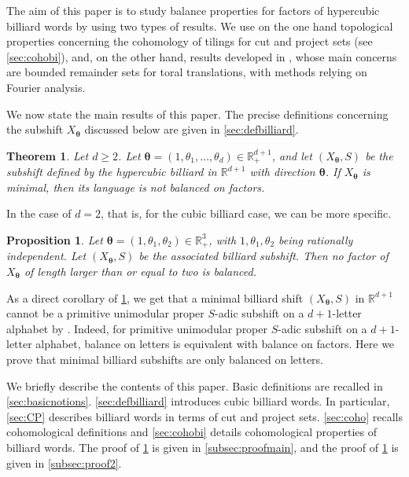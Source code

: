 \documentclass{article}
\newtheorem{theorem}[lemma]{Theorem}
\newtheorem{proposition}[lemma]{Proposition}
\theoremstyle{definition}
\newcommand{\btheta}{\boldsymbol{\theta}}
\begin{document}
The aim of this paper is to study balance properties for factors of   hypercubic billiard words  by using two types of results.
We use on the one hand    topological properties concerning  the cohomology of tilings for cut and project sets  (see \cref{sec:cohobi}),  and, on the other hand,    results developed  in \cite{GL:15,GrepLar:16},  whose main concerns are bounded remainder sets for toral translations, with methods relying  on  Fourier analysis.  

We now state the main results of this paper.
The precise definitions concerning the subshift $X_{\btheta}$  discussed  below are given in \cref{sec:defbilliard}.



\begin{theorem}\label{theo:main}
Let $d \geq 2$.
Let $\btheta= (1,\theta_1, \ldots,\theta_d)\in {\mathbb R}^{d+1}_+$,   and let $(X_{\btheta},S)$ be the subshift defined by the  hypercubic billiard   in $\mathbb R^{d+1}$ with  direction $\btheta$. If $X_{\btheta}$ is minimal, then its language is not balanced on factors. 

\end{theorem}

In the case of $d=2$, that is, for the cubic billiard case, we can be more specific. 
\begin{proposition}\label{prop:long2}
Let $\btheta= (1,\theta_1, \theta_2)\in {\mathbb R}^{3}_+$, with $1 ,\theta_1, \theta_2$ being rationally independent.
Let $(X_{\btheta}, S)$ be  the associated   billiard subshift. 
Then no factor of $X_{\btheta}$ of length  larger than or  equal  to two is  balanced.
\end{proposition}



As a direct  corollary of \cref{theo:main}, we get that     a minimal  billiard shift $(X_{\btheta}, S)$ in ${\mathbb R}^{d+1}$ cannot be a   primitive unimodular proper $S$-adic subshift on a $d+1$-letter alphabet by \cite[Corollary 5.5]{BCDLPP:19}. Indeed,   for  primitive unimodular proper $S$-adic subshift on a $d+1$-letter alphabet, balance on letters is equivalent with balance on factors.  Here we prove that  minimal billiard subshifts are  only balanced on letters.

 

We briefly describe the contents of this paper. Basic definitions are recalled in  \cref{sec:basicnotions}. \cref{sec:defbilliard}
introduces cubic billiard words. In particular, 
\cref{sec:CP}  describes billiard words in terms of cut and project sets. 
\cref{sec:coho} recalls   cohomological definitions and \cref{sec:cohobi} details cohomological properties of billiard words. The proof of 
\cref{theo:main} is given in \cref{subsec:proofmain}, and the proof of  \cref{prop:long2} is given in 
\cref{subsec:proof2}.
\end{document}
